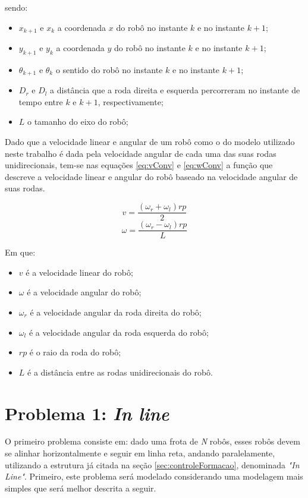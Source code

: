 sendo:
\begin{itemize}
	\item $x_{k+1}$ e $x_{k}$ a coordenada $x$ do robô no instante $k$ e no instante $k+1$;
	\item $y_{k+1}$ e $y_{k}$ a coordenada $y$ do robô no instante $k$ e no instante $k+1$;
	\item $\theta_{k+1}$ e $\theta_{k}$ o sentido do robô no instante $k$ e no instante $k+1$;	
	\item $D_{r}$ e $D_{l}$ a distância que a roda direita e esquerda percorreram no instante de tempo entre $k$ e $k+1$, respectivamente;
	\item $L$ o tamanho do eixo do robô;
\end{itemize}

Dado que a velocidade linear e angular de um robô como o do modelo utilizado neste trabalho é dada pela velocidade angular de cada uma das suas rodas unidirecionais, tem-se nas equações \ref{eq:vConv} e \ref{eq:wConv} a função que descreve a velocidade linear e angular do robô baseado na velocidade angular de suas rodas.

\begin{equation}
v = \dfrac{(\omega_{r} + \omega_{l}) rp}{2}
\label{eq:vConv}
\end{equation}
\begin{equation}
\omega = \dfrac{(\omega_{r} - \omega_{l}) rp}{L}
\label{eq:wConv}
\end{equation}

Em que:
\begin{itemize}
	\item $v$ é a velocidade linear do robô;
	\item $\omega$ é a velocidade angular do robô;
	\item $\omega_{r}$ é a velocidade angular da roda direita do robô;
	\item $\omega_{l}$ é a velocidade angular da roda esquerda do robô;
	\item $rp$ é o raio da roda do robô;
	\item $L$ é a distância entre as rodas unidirecionais do robô.
\end{itemize}

\section{Problema 1: \emph{In line}}
\label{sec:P1}
O primeiro problema consiste em: dado uma frota de \emph{N} robôs, esses robôs devem se alinhar horizontalmente e seguir em linha reta, andando paralelamente, utilizando a estrutura já citada na seção \ref{sec:controleFormacao}, denominada \emph{"In Line"}. Primeiro, este problema será modelado considerando uma modelagem mais simples que será melhor descrita a seguir. 

